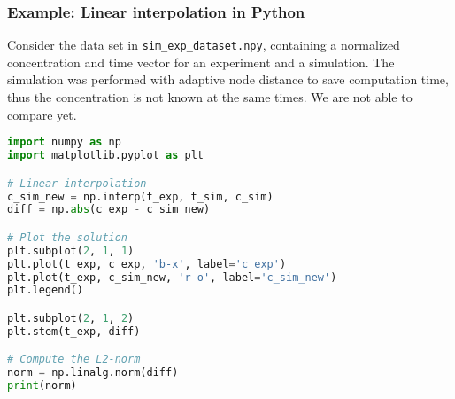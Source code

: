 \begin{frame}[t,fragile]
  \frametitle{Example: Linear interpolation in Python}
  \footnotesize\selectfont
  Consider the data set in \lstinline$sim_exp_dataset.npy$, containing a normalized concentration and time vector for an experiment and a simulation. The simulation was performed with adaptive node distance to save computation time, thus the concentration is not known at the same times. We are not able to compare yet.
  \vfill
  \begin{lstlisting}[language=Python]
import numpy as np
import matplotlib.pyplot as plt

# Linear interpolation
c_sim_new = np.interp(t_exp, t_sim, c_sim)
diff = np.abs(c_exp - c_sim_new)

# Plot the solution
plt.subplot(2, 1, 1)
plt.plot(t_exp, c_exp, 'b-x', label='c_exp')
plt.plot(t_exp, c_sim_new, 'r-o', label='c_sim_new')
plt.legend()

plt.subplot(2, 1, 2)
plt.stem(t_exp, diff)

# Compute the L2-norm
norm = np.linalg.norm(diff)
print(norm)
  \end{lstlisting}
\end{frame}



